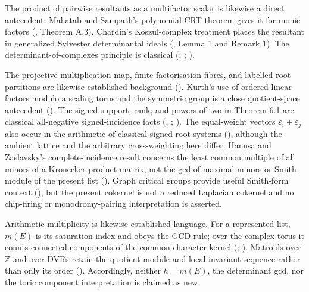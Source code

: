 \documentclass[
  11pt,
  a4paper,
]{article}
\begin{document}
The product of pairwise resultants as a multifactor scalar is likewise a
direct antecedent: Mahatab and Sampath's polynomial CRT theorem gives it
for monic factors (, Theorem A.3). Chardin's Koszul-complex treatment places the
resultant in generalized Sylvester determinantal ideals
(, Lemma 1 and Remark
1). The determinant-of-complexes principle is classical
(;
;
).

The projective multiplication map, finite factorisation fibres, and
labelled root partitions are likewise established background
().
Kurth's use of ordered linear factors modulo a scaling torus and the
symmetric group is a close quotient-space antecedent
(). The signed support, rank, and
powers of two in Theorem 6.1 are classical all-negative signed-incidence
facts (,
;
).
The equal-weight vectors \(\varepsilon_i+\varepsilon_j\) also occur in
the arithmetic of classical signed root systems
(),
although the ambient lattice and the arbitrary cross-weighting here
differ. Hanusa and Zaslavsky's complete-incidence result concerns the
least common multiple of all minors of a Kronecker-product matrix, not
the gcd of maximal minors or Smith module of the present list
(). Graph
critical groups provide useful Smith-form context
(), but the present cokernel
is not a reduced Laplacian cokernel and no chip-firing or
monodromy-pairing interpretation is asserted.

Arithmetic multiplicity is likewise established language. For a
represented list, \(m(E)\) is its saturation index and obeys the GCD
rule; over the complex torus it counts connected components of the
common character kernel (;
). Matroids over
\(\mathbb Z\) and over DVRs retain the quotient module and local
invariant sequence rather than only its order
(). Accordingly, neither
\(h=m(E)\), the determinant gcd, nor the toric component interpretation
is claimed as new.
\end{document}
